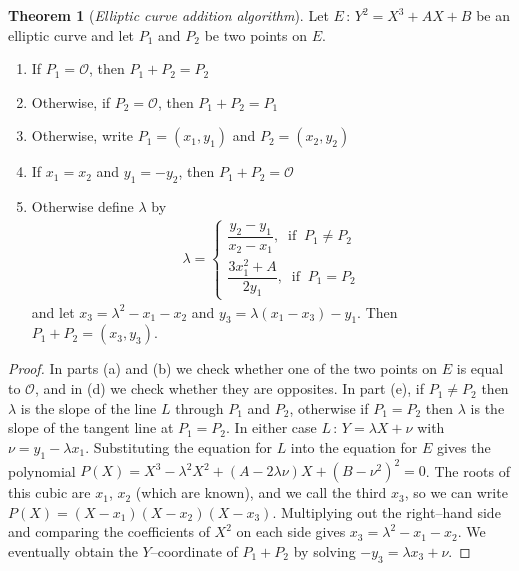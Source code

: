 \documentclass[9pt]{article}
\theoremstyle{definition}
\newtheorem{theorem}{Theorem}[section]
\begin{document}
\begin{theorem}[\textit{Elliptic curve addition algorithm}]
	Let $E \, : \, Y^2 = X^3 + AX + B$ be an elliptic curve and let $P_1$ and $P_2$ be two points on $E$.
	\begin{enumerate}[label=(\alph*)]
		\item If $P_1 = \mathcal{O}$, then $P_1 + P_2 = P_2$
		\item Otherwise, if $P_2 = \mathcal{O}$, then $P_1 + P_2 = P_1$
		\item Otherwise, write $P_1 = (x_1, y_1)$ and $P_2 = (x_2, y_2)$
		\item If $x_1 = x_2$ and $y_1 = -y_2$, then $P_1 + P_2 = \mathcal{O}$
		\item Otherwise define $\lambda$ by
			  \begin{align*}
			  	\lambda = 
			  	\begin{cases*}
			  		\dfrac{y_2 - y_1}{x_2 - x_1}, \;\; \text{if} \;\; P_1 \neq P_2\\
			  		\dfrac{3x_1^2 + A}{2y_1}, \;\; \text{if} \;\; P_1 = P_2
			  	\end{cases*}
			  \end{align*}
			  and let $x_3 = \lambda^2 - x_1 - x_2$ and $y_3 = \lambda(x_1 - x_3) - y_1$. Then $P_1 + P_2 = (x_3, y_3).$
	\end{enumerate}
    \label{th:ecaa}
\end{theorem}
\begin{proof}
	In parts (a) and (b) we check whether one of the two points on $E$ is equal to $\mathcal{O}$, and in (d) we check whether they are opposites. In part (e), if $P_1 \neq P_2$ then $\lambda$ is the slope of the line $L$ through $P_1$ and $P_2$, otherwise if $P_1 = P_2$ then $\lambda$ is the slope of the tangent line at $P_1 = P_2$. In either case $L \, : \, Y = \lambda X + \nu$ with $\nu = y_1 - \lambda x_1$. Substituting the equation for $L$ into the equation for $E$ gives the polynomial $P(X) = X^3 - \lambda^2 X^2 + (A - 2\lambda\nu)X + (B - \nu^2)^2 = 0$. The roots of this cubic are $x_1$, $x_2$ (which are known), and we call the third $x_3$, so we can write $P(X) = (X - x_1)(X - x_2)(X - x_3)$. Multiplying out the right--hand side and comparing the coefficients of $X^2$ on each side gives $x_3 = \lambda^2 - x_1 - x_2$. We eventually obtain the $Y$--coordinate of $P_1 + P_2$ by solving $-y_3 = \lambda x_3 + \nu$.
\end{proof}
\end{document}
